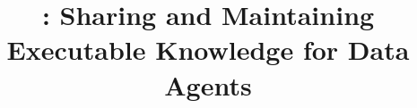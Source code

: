 

\title{\system: Sharing and Maintaining Executable Knowledge for Data Agents}

\author{
}

\maketitle
\suppressfloats[t]









\clearpage

\renewcommand{\IEEEbibitemsep}{0pt plus 1pt}




